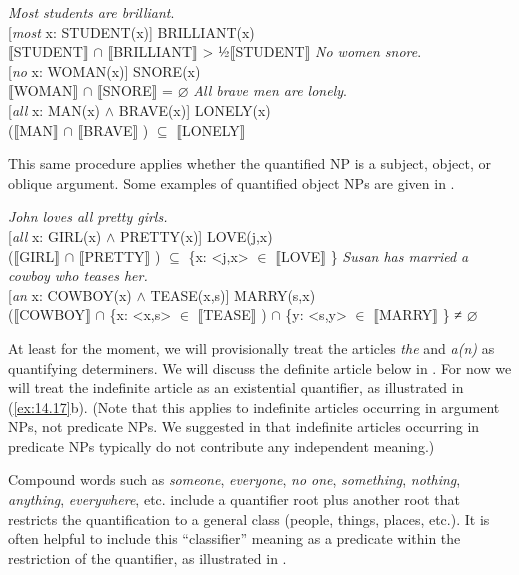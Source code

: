 \ea \label{ex:14.16}
\ea  \textit{Most students are brilliant}.\\
{}[\textit{most} x: STUDENT(x)] BRILLIANT(x)\\
{\textbar} \textsc{$\llbracket$}STUDENT$\rrbracket$  ${\cap}$ \textsc{$\llbracket$}BRILLIANT$\rrbracket$  {\textbar}  >  ½\textsc{{\textbar}}\textsc{$\llbracket$}STUDENT$\rrbracket$ {\textbar}
\ex \textit{No women snore}.\\
{}[\textit{no} x: WOMAN(x)] SNORE(x)\\
\textsc{$\llbracket$}WOMAN$\rrbracket$  ${\cap}$ \textsc{$\llbracket$}SNORE$\rrbracket$  = ⌀
\ex   \textit{All brave men are lonely}.\\
{}[\textit{all} x: MAN(x) $\wedge$ BRAVE(x)] LONELY(x)\\
\textsc{($\llbracket$}MAN$\rrbracket$  ${\cap}$ \textsc{$\llbracket$}BRAVE$\rrbracket$ )  ${\subseteq}$ \textsc{$\llbracket$}LONELY$\rrbracket$ 
\z \z


This same procedure applies whether the quantified NP is a subject, object, or oblique argument. Some examples of quantified object NPs are given in .


\ea \label{ex:14.17}
\ea \textit{John loves all pretty girls.}\\
{}[\textit{all} x: GIRL(x) $\wedge$ PRETTY(x)] LOVE(j,x)\\
($\llbracket$GIRL$\rrbracket$  ${\cap}$ $\llbracket$PRETTY$\rrbracket$ ) ${\subseteq}$ \{x: <j,x> ${\in}$ $\llbracket$LOVE$\rrbracket$ \}
\ex \textit{Susan has married a cowboy who teases her.}\\
{}[\textit{an} x: COWBOY(x) $\wedge$ TEASE(x,s)] MARRY(s,x)\\
($\llbracket$COWBOY$\rrbracket$  ${\cap}$ \{x: <x,s> ${\in}$ $\llbracket$TEASE$\rrbracket$ ) ${\cap}$ \{y: <s,y> ${\in}$ $\llbracket$MARRY$\rrbracket$ \} ≠ ⌀
\z \z


At least for the moment, we will provisionally treat the articles \textit{the} and \textit{a(n)} as quantifying determiners. We will discuss the definite article below in . For now we will treat the indefinite article as an existential quantifier, as illustrated in (\ref{ex:14.17}b). (Note that this applies to indefinite articles occurring in argument NPs, not predicate NPs. We suggested in  that indefinite articles occurring in predicate NPs typically do not contribute any independent meaning.)



Compound words such as \textit{someone}, \textit{everyone}, \textit{no one}, \textit{something}, \textit{nothing}, \textit{anything}, \textit{everywhere}, etc. include a quantifier root plus another root that restricts the quantification to a general class (people, things, places, etc.). It is often helpful to include this “classifier” meaning as a predicate within the restriction of the quantifier, as illustrated in .


